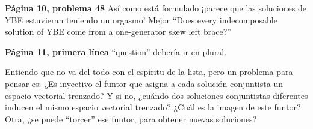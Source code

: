 \documentclass[11pt,fleqn]{article}
\begin{document}
\textbf{Página 10, problema 48} Así como está formulado ¡parece que las 
soluciones de YBE estuvieran teniendo un orgasmo! Mejor ``Does every 
indecomposable solution of YBE come from a one-generator skew left brace?''

\textbf{Página 11, primera línea} ``question'' debería ir en plural.

Entiendo que no va del todo con el espíritu de la lista, pero un problema
para pensar es: ¿Es inyectivo el funtor que asigna a cada solución conjuntista
un espacio vectorial trenzado? Y si no, ¿cuándo dos soluciones conjuntistas 
diferentes inducen el mismo espacio vectorial trenzado? ¿Cuál es la imagen de 
este funtor? Otra, ¿se puede ``torcer'' ese funtor, para obtener nuevas 
soluciones?
\end{document}
